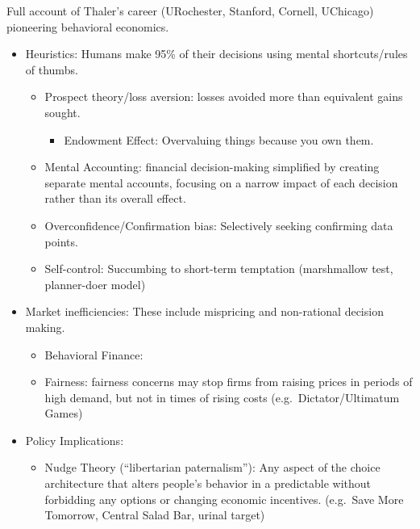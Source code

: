 \documentclass[
]{article}
\providecommand{\tightlist}{%
  \setlength{\itemsep}{0pt}\setlength{\parskip}{0pt}}
\begin{document}
Full account of Thaler's career (URochester, Stanford, Cornell,
UChicago) pioneering behavioral economics.

\begin{itemize}
\item
  Heuristics: Humans make 95\% of their decisions using mental
  shortcuts/rules of thumbs.

  \begin{itemize}
  \item
    Prospect theory/loss aversion: losses avoided more than equivalent
    gains sought.

    \begin{itemize}
    \tightlist
    \item
      Endowment Effect: Overvaluing things because you own them.
    \end{itemize}
  \item
    Mental Accounting: financial decision-making simplified by creating
    separate mental accounts, focusing on a narrow impact of each
    decision rather than its overall effect.
  \item
    Overconfidence/Confirmation bias: Selectively seeking confirming
    data points.
  \item
    Self-control: Succumbing to short-term temptation (marshmallow test,
    planner-doer model)
  \end{itemize}
\item
  Market inefficiencies: These include mispricing and non-rational
  decision making.

  \begin{itemize}
  \item
    Behavioral Finance:
  \item
    Fairness: fairness concerns may stop firms from raising prices in
    periods of high demand, but not in times of rising costs
    (e.g.~Dictator/Ultimatum Games)
  \end{itemize}
\item
  Policy Implications:

  \begin{itemize}
  \tightlist
  \item
    Nudge Theory (``libertarian paternalism''): Any aspect of the choice
    architecture that alters people's behavior in a predictable without
    forbidding any options or changing economic incentives. (e.g.~Save
    More Tomorrow, Central Salad Bar, urinal target)
  \end{itemize}
\end{itemize}
\end{document}
